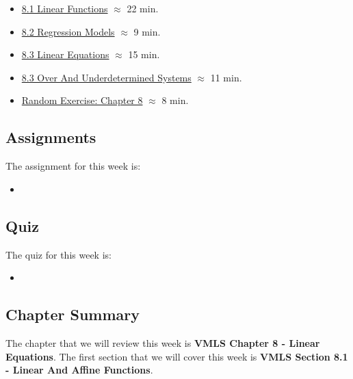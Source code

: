 \begin{itemize}
    \item \href{https://applied.cs.colorado.edu/mod/hvp/view.php?id=50757}{8.1 Linear Functions} $\approx$ 22 min.
    \item \href{https://applied.cs.colorado.edu/mod/hvp/view.php?id=50758}{8.2 Regression Models} $\approx$ 9 min.
    \item \href{https://applied.cs.colorado.edu/mod/hvp/view.php?id=50759}{8.3 Linear Equations} $\approx$ 15 min.
    \item \href{https://applied.cs.colorado.edu/mod/hvp/view.php?id=50760}{8.3 Over And Underdetermined Systems} $\approx$ 11 min.
    \item \href{https://applied.cs.colorado.edu/mod/hvp/view.php?id=50761}{Random Exercise: Chapter 8} $\approx$ 8 min.
\end{itemize}

\subsection{Assignments}

The assignment for this week is:

\begin{itemize}
    \item {}
\end{itemize}

\subsection{Quiz}

The quiz for this week is:

\begin{itemize}
    \item {}
\end{itemize}

\subsection{Chapter Summary}

The chapter that we will review this week is \textbf{VMLS Chapter 8 - Linear Equations}. The first section that we will cover this week is \textbf{VMLS Section 8.1 - Linear And Affine Functions}.

